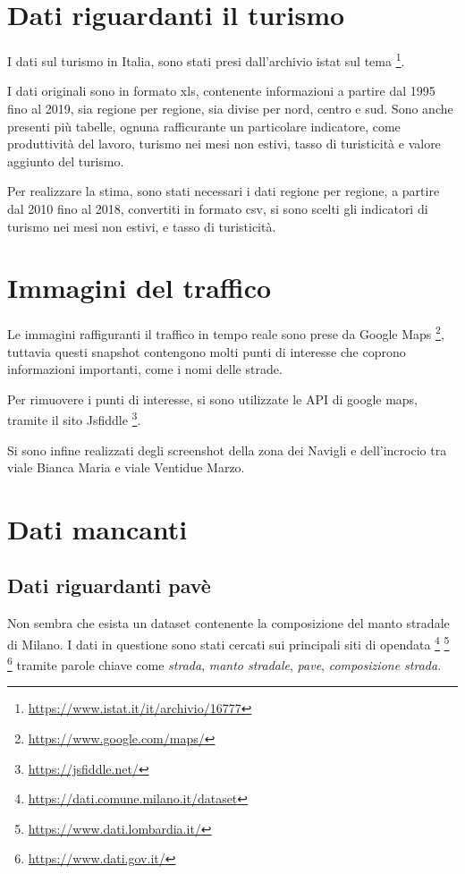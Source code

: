 \documentclass[a4paper]{report}
\begin{document}

\section{Dati riguardanti il turismo}

I dati sul turismo in Italia, sono stati presi dall'archivio istat sul tema
\footnote{\url{https://www.istat.it/it/archivio/16777}}.

I dati originali sono in formato xls, contenente informazioni a partire dal 1995 fino al 2019, 
sia regione per regione, sia divise per nord, centro e sud.
Sono anche presenti più tabelle, ognuna rafficurante un particolare indicatore, 
come produttività del lavoro, turismo nei mesi non estivi, tasso di turisticità 
e valore aggiunto del turismo.

Per realizzare la stima, sono stati necessari i dati regione per regione, 
a partire dal 2010 fino al 2018, convertiti in formato csv, si sono scelti gli indicatori di 
turismo nei mesi non estivi, e tasso di turisticità. 

\section{Immagini del traffico}

Le immagini raffiguranti il traffico in tempo reale sono prese da Google Maps
\footnote{\url{https://www.google.com/maps/}}, 
tuttavia questi snapshot contengono molti punti di interesse che coprono informazioni importanti, 
come i nomi delle strade.

Per rimuovere i punti di interesse, si sono utilizzate le API di google maps, 
tramite il sito Jsfiddle
\footnote{\url{https://jsfiddle.net/}}.

Si sono infine realizzati degli screenshot della zona dei Navigli e dell'incrocio tra viale 
Bianca Maria e viale Ventidue Marzo.

\section{Dati mancanti}

\subsection{Dati riguardanti pavè}
Non sembra che esista un dataset contenente la composizione del manto stradale di Milano.
I dati in questione sono stati cercati sui principali siti di opendata
\footnote{\url{https://dati.comune.milano.it/dataset}}
\footnote{\url{https://www.dati.lombardia.it/}}
\footnote{\url{https://www.dati.gov.it/}}
tramite parole chiave come \textit{strada}, \textit{manto stradale}, \textit{pave}, 
\textit{composizione strada}.
\end{document}
